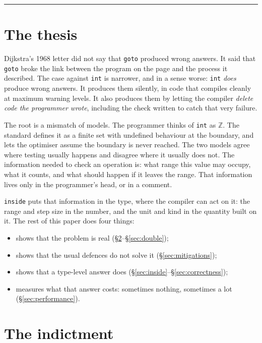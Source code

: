 \documentclass[11pt,a4paper]{article}
\newcommand{\code}[1]{\texttt{\small #1}}
\begin{document}
\vspace{0.8em}
\noindent\rule{\textwidth}{0.4pt}

\tableofcontents
\newpage

\section{The thesis}

Dijkstra's 1968 letter did not say that \code{goto} produced wrong answers. It
said that \code{goto} broke the link between the program on the page and the
process it described. The case against \code{int} is narrower, and in a sense
worse: \code{int} \emph{does} produce wrong answers. It produces them silently,
in code that compiles cleanly at maximum warning levels. It also produces them
by letting the compiler \emph{delete code the programmer wrote}, including the
check written to catch that very failure.

The root is a mismatch of models. The programmer thinks of \code{int} as
$\mathbb{Z}$. The standard defines it as a finite set with undefined behaviour
at the boundary, and lets the optimiser assume the boundary is never reached.
The two models agree where testing usually happens and disagree where it
usually does not. The information needed to check an operation is: what range
this value may occupy, what it counts, and what should happen if it leaves the
range. That information lives only in the programmer's head, or in a comment.

\code{inside} puts that information in the type, where the compiler can act on
it: the range and step size in the number, and the unit and kind in the
quantity built on it. The rest of this paper does four things:
\begin{itemize}
\item shows that the problem is real (\S\ref{sec:indictment}--\S\ref{sec:double});
\item shows that the usual defences do not solve it (\S\ref{sec:mitigations});
\item shows that a type-level answer does (\S\ref{sec:inside}--\S\ref{sec:correctness});
\item measures what that answer costs: sometimes nothing, sometimes a lot (\S\ref{sec:performance}).
\end{itemize}

\section{The indictment}\label{sec:indictment}
\end{document}
